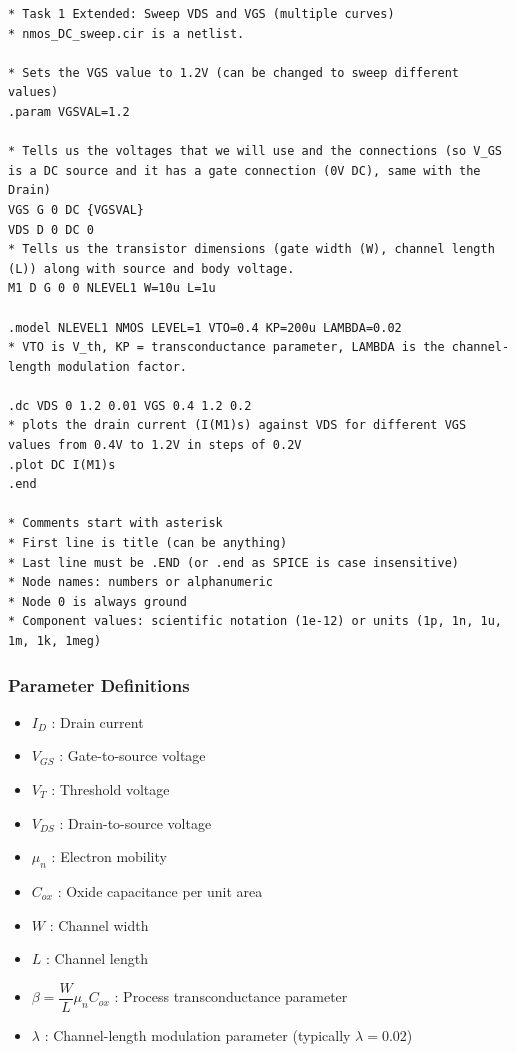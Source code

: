 \documentclass[a4paper,12pt]{article}
\begin{document}
\begin{lstlisting}[caption=NMOS Sweep Simulation Code, label=lst:nmos_sweep]
* Task 1 Extended: Sweep VDS and VGS (multiple curves)
* nmos_DC_sweep.cir is a netlist.

* Sets the VGS value to 1.2V (can be changed to sweep different values)
.param VGSVAL=1.2 

* Tells us the voltages that we will use and the connections (so V_GS is a DC source and it has a gate connection (0V DC), same with the Drain)
VGS G 0 DC {VGSVAL}
VDS D 0 DC 0
* Tells us the transistor dimensions (gate width (W), channel length (L)) along with source and body voltage.
M1 D G 0 0 NLEVEL1 W=10u L=1u

.model NLEVEL1 NMOS LEVEL=1 VTO=0.4 KP=200u LAMBDA=0.02
* VTO is V_th, KP = transconductance parameter, LAMBDA is the channel-length modulation factor.

.dc VDS 0 1.2 0.01 VGS 0.4 1.2 0.2
* plots the drain current (I(M1)s) against VDS for different VGS values from 0.4V to 1.2V in steps of 0.2V
.plot DC I(M1)s 
.end

* Comments start with asterisk
* First line is title (can be anything)
* Last line must be .END (or .end as SPICE is case insensitive)
* Node names: numbers or alphanumeric
* Node 0 is always ground
* Component values: scientific notation (1e-12) or units (1p, 1n, 1u, 1m, 1k, 1meg)
\end{lstlisting}

\subsubsection*{Parameter Definitions}
\begin{itemize}
    \item $I_D$ : Drain current
    \item $V_{GS}$ : Gate-to-source voltage
    \item $V_T$ : Threshold voltage
    \item $V_{DS}$ : Drain-to-source voltage
    \item $\mu_n$ : Electron mobility
    \item $C_{ox}$ : Oxide capacitance per unit area
    \item $W$ : Channel width
    \item $L$ : Channel length
    \item $\beta = \dfrac{W}{L}\mu_n C_{ox}$ : Process transconductance parameter
    \item $\lambda$ : Channel-length modulation parameter (typically $\lambda = 0.02$)
\end{itemize}
\end{document}
